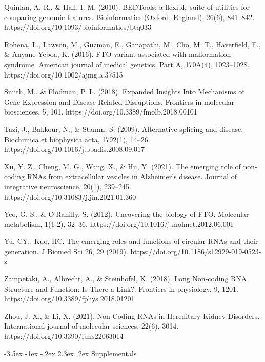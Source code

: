 \documentclass[11pt]{article}
\makeatletter
\renewcommand\section{\@startsection {section}{1}{\z@}%
                                       {-3.5ex \@plus -1ex \@minus -.2ex}%
                                       {2.3ex \@plus.2ex}%
                                       {\normalfont\fontfamily{phv}\fontsize{16}{19}\bfseries}}
\makeatother
\begin{document}
Quinlan, A. R., & Hall, I. M. (2010). BEDTools: a flexible suite of utilities for comparing genomic features. Bioinformatics (Oxford, England), 26(6), 841–842. https://doi.org/10.1093/bioinformatics/btq033 

Rohena, L., Lawson, M., Guzman, E., Ganapathi, M., Cho, M. T., Haverfield, E., & Anyane-Yeboa, K. (2016). FTO variant associated with malformation syndrome. American journal of medical genetics. Part A, 170A(4), 1023–1028. https://doi.org/10.1002/ajmg.a.37515 

Smith, M., & Flodman, P. L. (2018). Expanded Insights Into Mechanisms of Gene Expression and Disease Related Disruptions. Frontiers in molecular biosciences, 5, 101. https://doi.org/10.3389/fmolb.2018.00101 

Tazi, J., Bakkour, N., & Stamm, S. (2009). Alternative splicing and disease. Biochimica et biophysica acta, 1792(1), 14–26. https://doi.org/10.1016/j.bbadis.2008.09.017 

Xu, Y. Z., Cheng, M. G., Wang, X., & Hu, Y. (2021). The emerging role of non-coding RNAs from extracellular vesicles in Alzheimer's disease. Journal of integrative neuroscience, 20(1), 239–245. https://doi.org/10.31083/j.jin.2021.01.360 

Yeo, G. S., & O'Rahilly, S. (2012). Uncovering the biology of FTO. Molecular metabolism, 1(1-2), 32–36. https://doi.org/10.1016/j.molmet.2012.06.001 

Yu, CY., Kuo, HC. The emerging roles and functions of circular RNAs and their generation. J Biomed Sci 26, 29 (2019). https://doi.org/10.1186/s12929-019-0523-z 

Zampetaki, A., Albrecht, A., & Steinhofel, K. (2018). Long Non-coding RNA Structure and Function: Is There a Link?. Frontiers in physiology, 9, 1201. https://doi.org/10.3389/fphys.2018.01201 

Zhou, J. X., & Li, X. (2021). Non-Coding RNAs in Hereditary Kidney Disorders. International journal of molecular sciences, 22(6), 3014. https://doi.org/10.3390/ijms22063014 

 



\section{Supplementals} \label{s:supplementals}

\end{document}
